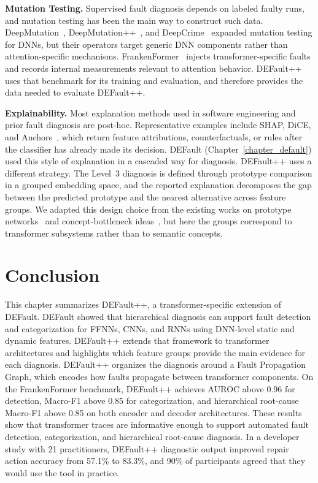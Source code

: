 \textbf{Mutation Testing.}
Supervised fault diagnosis depends on labeled faulty runs, and mutation testing has been the main way to construct such data. DeepMutation~\cite{deepmutation}, DeepMutation++~\cite{deepmutation++}, and DeepCrime~\cite{deepcrime} expanded mutation testing for DNNs, but their operators target generic DNN components rather than attention-specific mechanisms. FrankenFormer~\cite{frankenformer} injects transformer-specific faults and records internal measurements relevant to attention behavior. DEFault++ uses that benchmark for its training and evaluation, and therefore provides the data needed to evaluate DEFault++.

\textbf{Explainability.}
Most explanation methods used in software engineering and prior fault diagnosis are post-hoc. Representative examples include SHAP, DiCE, and Anchors~\cite{lundberg2017unified,mothilal2020dice,ribeiro2018anchors}, which return feature attributions, counterfactuals, or rules after the classifier has already made its decision. DEFault (Chapter~\ref{chapter_default}) used this style of explanation in a cascaded way for diagnosis. DEFault++ uses a different strategy. The Level~3 diagnosis is defined through prototype comparison in a grouped embedding space, and the reported explanation decomposes the gap between the predicted prototype and the nearest alternative across feature groups. We adapted this design choice from the existing works on prototype networks~\cite{snell2017prototypical} and concept-bottleneck ideas~\cite{koh2020concept}, but here the groups correspond to transformer subsystems rather than to semantic concepts.


\section{Conclusion}
\label{sec:defaultpp_summary}

This chapter summarizes DEFault++, a transformer-specific extension of DEFault. DEFault showed that hierarchical diagnosis can support fault detection and categorization for FFNNs, CNNs, and RNNs using DNN-level static and dynamic features. DEFault++ extends that framework to transformer architectures and highlights which feature groups provide the main evidence for each diagnosis. DEFault++ organizes the diagnosis around a Fault Propagation Graph, which encodes how faults propagate between transformer components. On the FrankenFormer benchmark, DEFault++ achieves AUROC above 0.96 for detection, Macro-F1 above 0.85 for categorization, and hierarchical root-cause Macro-F1 above 0.85 on both encoder and decoder architectures. These results show that transformer traces are informative enough to support automated fault detection, categorization, and hierarchical root-cause diagnosis. In a developer study with 21 practitioners, DEFault++ diagnostic output improved repair action accuracy from 57.1\% to 83.3\%, and 90\% of participants agreed that they would use the tool in practice.

